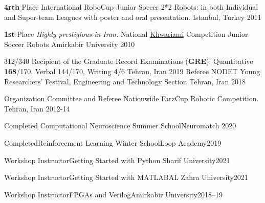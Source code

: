 \begin{cvhonors}
   \cvhonor
   {\textbf{4rth} Place}
    {International RoboCup Junior Soccer 2*2 Robots: in both Individual and Super-team Leagues with poster and oral presentation.}
    {Istanbul, Turkey}
	{2011}
  
    
  \cvhonor
  {\textbf{1st} Place}
  {\textit{Highly prestigious in Iran.} National \href{https://en.wikipedia.org/wiki/Khwarizmi_International_Award}{Khwarizmi} Competition Junior Soccer Robots}
  {Amirkabir University}
	{2010}
\end{cvhonors}

\pagebreak




\begin{cvhonors}

  \cvhonor
    {312/340} %
    {Recipient of the Graduate Record Examinations (\textbf{GRE}): Quantitative \textbf{168}/170, Verbal 144/170, Writing \textbf{4}/6} %
    {Tehran, Iran} %
    {2019} %
     \cvhonor
  {Referee}
  {NODET Young Researchers’ Festival, Engineering and Technology Section}
  {Tehran, Iran}
	{2018}

  \cvhonor
    {Organization Committee and Referee}
    {Nationwide FarzCup Robotic Competition.}
    {Tehran, Iran}
    {2012-14}

    
\cvhonor
{Completed}
{Computational Neuroscience Summer School}{Neuromatch}
{2020}

\cvhonor
{Completed}{Reinforcement Learning Winter School}{Loop Academy}{2019}

\cvhonor
{Workshop Instructor}{Getting Started with Python}{ Sharif University}{2021}

\cvhonor
{Workshop Instructor}{Getting Started with MATLAB}{AL Zahra University}{2021}

\cvhonor
{Workshop Instructor}{FPGAs and Verilog}{Amirkabir University}{2018–19}
\end{cvhonors}